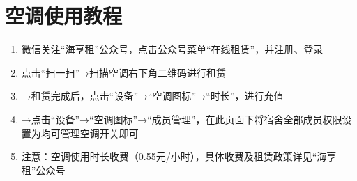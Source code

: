 \section[空调使用教程]{空调使用教程}
\label{air_control}
\begin{enumerate}
    \item 微信关注“海享租”公众号，点击公众号菜单“在线租赁”，并注册、登录
    \item 点击“扫一扫”→扫描空调右下角二维码进行租赁\footnotemark
    \item →租赁完成后，点击“设备”→“空调图标”→“时长”，进行充值
    \item →点击“设备”→“空调图标”→“成员管理”，在此页面下将宿舍全部成员权限设置为均可管理空调开关即可
    \item 注意：空调使用时长收费（0.55元/小时），具体收费及租赁政策详见“海享租”公众号
\end{enumerate}

